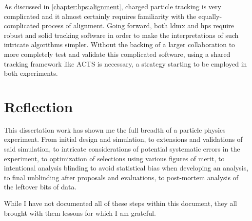As discussed in \cref{chapter:hps:alignment}, charged particle tracking is
very complicated and it almost certainly requires familiarity with the
equally-complicated process of alignment.
Going forward, both \ac{ldmx} and \ac{hps} require robust and solid tracking
software in order to make the interpretations of such intricate algorithms simpler.
Without the backing of a larger collaboration to more completely test
and validate this complicated software, using a shared tracking framework
like ACTS\cite{acts} is necessary, a strategy starting to be employed in both
experiments.

\section{Reflection}
This dissertation work has shown me the full breadth of a particle physics experiment.
From initial design and simulation, to extensions and validations of said simulation,
to intricate considerations of potential systematic errors in the experiment,
to optimization of selections using various figures of merit,
to intentional analysis blinding to avoid statistical bias when developing an analysis,
to final unblinding after proposals and evaluations,
to post-mortem analysis of the leftover bits of data.

While I have not documented all of these steps within this document,
they all brought with them lessons for which I am grateful.
